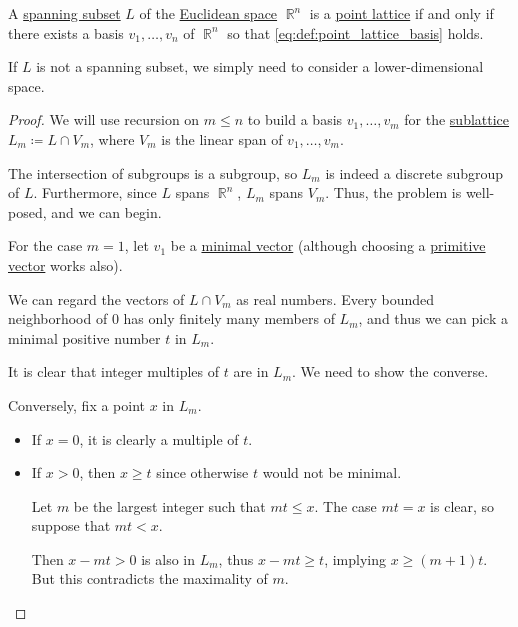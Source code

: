 \begin{proposition}\label{thm:point_lattice_via_basis}
  A \hyperref[def:semimodule/generated]{spanning subset} \( L \) of the \hyperref[def:euclidean_space]{Euclidean space} \( \BbbR^n \) is a \hyperref[def:point_lattice]{point lattice} if and only if there exists a basis \( v_1, \ldots, v_n \) of \( \BbbR^n \) so that \eqref{eq:def:point_lattice_basis} holds.
\end{proposition}
\begin{comments}
  \item If \( L \) is not a spanning subset, we simply need to consider a lower-dimensional space.
\end{comments}
\begin{proof}
  \SufficiencySubProof{} We will use recursion on \( m \leq n \) to build a basis \( v_1, \ldots, v_m \) for the \hyperref[def:point_sublattice]{sublattice} \( L_m \coloneqq L \cap V_m \), where \( V_m \) is the linear span of \( v_1, \ldots, v_m \).

  The intersection of subgroups is a subgroup, so \( L_m \) is indeed a discrete subgroup of \( L \). Furthermore, since \( L \) spans \( \BbbR^n \), \( L_m \) spans \( V_m \). Thus, the problem is well-posed, and we can begin.

   For the case \( m = 1 \), let \( v_1 \) be a \hyperref[def:minimal_lattice_vector]{minimal vector} (although choosing a \hyperref[def:primitive_lattice_vector]{primitive vector} works also).

  We can regard the vectors of \( L \cap V_m \) as real numbers. Every bounded neighborhood of \( 0 \) has only finitely many members of \( L_m \), and thus we can pick a minimal positive number \( t \) in \( L_m \).

  It is clear that integer multiples of \( t \) are in \( L_m \). We need to show the converse.

  Conversely, fix a point \( x \) in \( L_m \).
  \begin{itemize}
    \item If \( x = 0 \), it is clearly a multiple of \( t \).
    \item If \( x > 0 \), then \( x \geq t \) since otherwise \( t \) would not be minimal.

    Let \( m \) be the largest integer such that \( mt \leq x \). The case \( mt = x \) is clear, so suppose that \( mt < x \).

    Then \( x - mt > 0 \) is also in \( L_m \), thus \( x - mt \geq t \), implying \( x \geq (m + 1)t \). But this contradicts the maximality of \( m \).


\end{itemize}
\end{proof}
